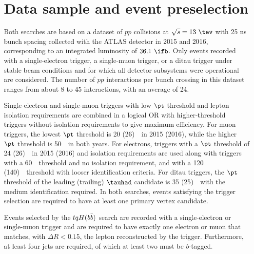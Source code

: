 \section{Data sample and event preselection}
\label{sec:data_presel}

Both searches are based on a dataset of $pp$ collisions at $\sqrt{s}=13~\tev$ with 25 ns bunch spacing collected 
with the ATLAS detector in 2015 and 2016, corresponding to an integrated luminosity of $36.1~\ifb$.
Only events recorded with a single-electron trigger, a single-muon trigger, or a ditau trigger under stable beam conditions 
and for which all detector subsystems were operational are considered.
The number of $pp$ interactions per bunch crossing in this dataset ranges from about 8 to 45 interactions, with an average of 24.

Single-electron and single-muon triggers with low $\pt$ threshold and lepton isolation requirements are combined in a logical OR 
with higher-threshold triggers without isolation requirements to give maximum efficiency. 
For muon triggers, the lowest $\pt$ threshold is 20 (26)~\gev\ in 2015 (2016), while the higher $\pt$ threshold is 50~\gev\ in both years. 
For electrons, triggers with a $\pt$ threshold of 24 (26)~\gev\ in 2015 (2016) and isolation requirements are used
along with triggers with a 60~\gev\ threshold and no isolation requirement, and with a 120 (140)~\gev\ threshold with looser identification criteria.
For ditau triggers, the $\pt$ threshold of the leading (trailing) $\tauhad$ candidate is 35 (25)~\gev\ with the medium identification required.
In both searches, events satisfying the trigger selection are required to have at least one primary vertex candidate.

Events selected by the $tqH(b\bar{b})$ search are recorded with a single-electron or single-muon trigger and 
are required to have exactly one electron or muon that matches, with $\Delta R < 0.15$, the lepton reconstructed by the trigger.  
Furthermore, at least four jets are required, of which at least two must be $b$-tagged.

